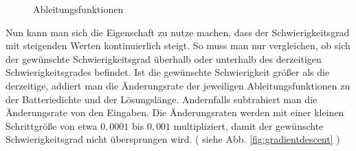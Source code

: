 \documentclass[a4paper,10pt,ngerman]{scrartcl}
\newcommand{\abbref}[1]{
  siehe Abb. \ref{#1}
}
\begin{document}
\begin{figure}[ht]
  \centering
  \begin{subfigure} {0.5\textwidth}
    \centering
  \end{subfigure}%
  \begin{subfigure} {0.5\textwidth}
    \centering
  \end{subfigure}
  \caption{Ableitungsfunktionen}
  \label{fig:differentials}
\end{figure}

Nun kann man sich die Eigenschaft zu nutze machen, dass der Schwierigkeitsgrad mit steigenden Werten kontinuierlich steigt.
So muss man nur vergleichen, ob sich der gewünschte Schwierigkeitsgrad überhalb oder unterhalb des derzeitigen Schwierigkeitsgrades befindet.
Ist die gewünschte Schwierigkeit größer als die derzeitige, addiert man die Änderungsrate der jeweiligen Ableitungsfunktionen zu der Batteriedichte und der Lösungslänge.
Andernfalls subtrahiert man die Änderungsrate von den Eingaben. Die Änderungsraten werden mit einer kleinen Schrittgröße von etwa $0,0001$ bis $0,001$ multipliziert,
damit der gewünschte Schwierigkeitsgrad nicht übersprungen wird. (\abbref{fig:gradientdescent})
\end{document}
